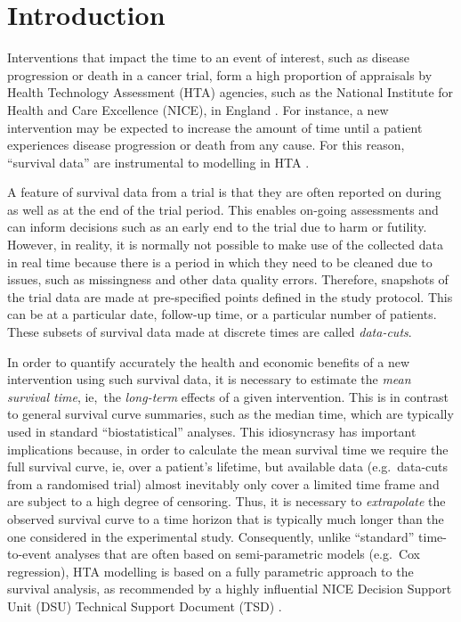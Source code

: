 \documentclass[AMA,STIX1COL]{WileyNJD-v2}
\begin{document}
\maketitle


\section{Introduction}\label{sec:intro}
Interventions that impact the time to an event of interest, such as disease progression or death in a cancer trial, form a high proportion of appraisals by Health Technology Assessment (HTA) agencies, such as the National Institute for Health and Care Excellence (NICE), in England \citep{Latimer2011}.
For instance, a new intervention may be expected to increase the amount of time until a patient experiences disease progression or death from any cause. For this reason, ``survival data'' are instrumental to modelling in HTA \cite{Demiris2006, Jackson2010}.

A feature of survival data from a trial is that they are often reported on during as well as at the end of the trial period.
This enables on-going assessments and can inform decisions such as an early end to the trial due to harm or futility.
However, in reality, it is normally not possible to make use of the collected data in real time because there is a period in which they need to be cleaned due to issues, such as missingness and other data quality errors.
Therefore, snapshots of the trial data are made at pre-specified points defined in the study protocol.
This can be at a particular date, follow-up time, or a particular number of patients.
These subsets of survival data made at discrete times are called \textit{data-cuts}.

In order to quantify accurately the health and economic benefits of a new intervention using such survival data, it is necessary to estimate the {\it mean survival time}, ie,~the \textit{long-term} effects of a given intervention.
This is in contrast to general survival curve summaries, such as the median time, which are typically used in standard ``biostatistical'' analyses.
This idiosyncrasy has important implications because, in order to calculate the mean survival time we require the full survival curve, ie, over a patient's lifetime, but available data (e.g.~data-cuts from a randomised trial) almost inevitably only cover a limited time frame and are subject to a high degree of censoring.
Thus, it is necessary to \textit{extrapolate} the observed survival curve to a time horizon that is typically much longer than the one considered in the experimental study.
Consequently, unlike ``standard'' time-to-event analyses that are often based on semi-parametric models (e.g.~Cox regression), HTA modelling is based on a fully parametric approach to the survival analysis, as recommended by a highly influential NICE Decision Support Unit (DSU) Technical Support Document (TSD) \citep{Latimer2011}.
\end{document}
